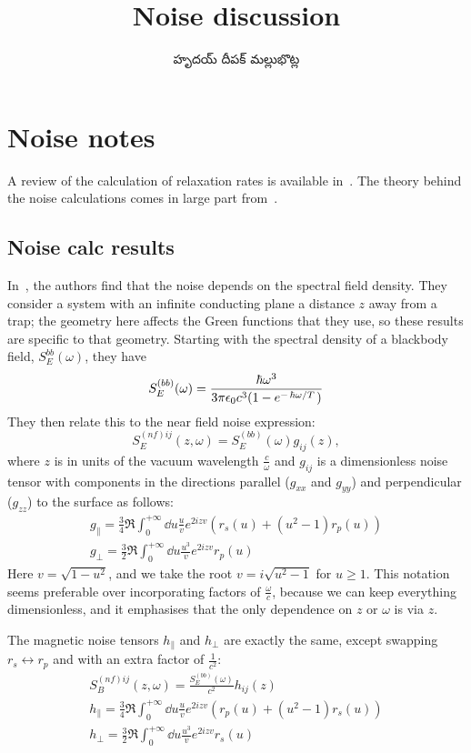 \documentclass[../main.tex]{subfiles}
\title{Noise discussion}
\author{\begin{telugu}హృదయ్ దీపక్ మల్లుభొట్ల\end{telugu}}
\date{}
\begin{document}
	\onlyinsubfile{\maketitle}
	\section{Noise notes} \label{sec:NoiseCalc}
	A review of the calculation of relaxation rates is available in~\cite{Henkel1999}.
	The theory behind the noise calculations comes in large part from~\cite{Agarwal1975}.

	\subsection{Noise calc results} \label{subsec:NoiseCalcResults}
	In~\cite{Henkel1999}, the authors find that the noise depends on the spectral field density.
	They consider a system with an infinite conducting plane a distance $z$ away from a trap;
	the geometry here affects the Green functions that they use, so these results are specific to that geometry.
	Starting with the spectral density of a blackbody field, $S^{bb}_E(\omega)$, they have
	\begin{equation}
		S^{(bb)}_E(\omega) = \frac{\hbar \omega^3}{3 \pi \epsilon_0 c^3 (1 - e^{-\flatfrac{\hbar \omega}{T}})}
	\end{equation}
	They then relate this to the near field noise expression:
	\begin{equation}
		S^{(nf)ij}_E(z, \omega) = S^{(bb)}_E(\omega) g_{ij}(z),
	\end{equation}
	where $z$ is in units of the vacuum wavelength $\frac{c}{\omega}$ and $g_{ij}$ is a dimensionless noise tensor with components in the directions parallel ($g_{xx}$ and $g_{yy}$) and perpendicular ($g_{zz}$) to the surface as follows:
	\begin{gather}
		g_\parallel = \frac34 \Re \int_0^{+\infty} \dd{u} \frac{u}{v} e^{2i z v} \left(r_s(u) + \left(u^2 - 1\right) r_p(u) \right) \\
		g_\perp = \frac32 \Re \int_0^{+\infty} \dd{u} \frac{u^3}{v} e^{2 i z v} r_p(u)
	\end{gather}
	Here $v = \sqrt{1 - u^2}$, and we take the root $v = i \sqrt{u^2 - 1}$ for $u \geq 1$.
	This notation seems preferable over incorporating factors of $\frac{\omega}{c}$, because we can keep everything dimensionless, and it emphasises that the only dependence on $z$ or $\omega$ is via $z$.

	The magnetic noise tensors $h_\parallel$ and $h_\perp$ are exactly the same, except swapping $r_s \leftrightarrow r_p$ and with an extra factor of $\frac{1}{c^2}$:
	\begin{gather}
		S^{(nf)ij}_B(z, \omega) = \frac{S^{(bb)}_E(\omega)}{c^2} h_{ij}(z) \\
		h_\parallel = \frac34 \Re \int_0^{+\infty} \dd{u} \frac{u}{v} e^{2i z v} \left(r_p(u) + \left(u^2 - 1\right) r_s(u) \right) \\
		h_\perp = \frac32 \Re \int_0^{+\infty} \dd{u} \frac{u^3}{v} e^{2 i z v} r_s(u)
	\end{gather}
\end{document}
